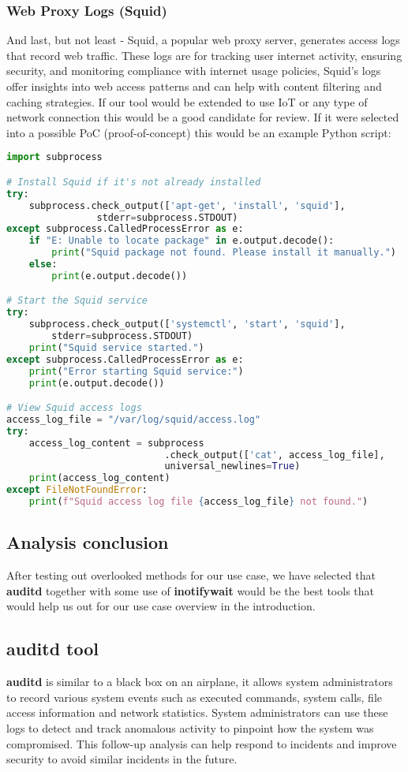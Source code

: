\documentclass{VUMIFPSmagistrinis}
\begin{document}
\subsubsection{Web Proxy Logs (Squid)}
And last, but not least - Squid, a popular web proxy server, generates access logs that record web traffic. These logs are for tracking user internet activity, ensuring security, and monitoring compliance with internet usage policies, Squid's logs offer insights into web access patterns and can help with content filtering and caching strategies. If our tool would be extended to use IoT or any type of network connection this would be a good candidate for review. If it were selected into a possible PoC (proof-of-concept) this would be an example Python script:
\begin{lstlisting}[language=Python]
import subprocess

# Install Squid if it's not already installed
try:
    subprocess.check_output(['apt-get', 'install', 'squid'], 
                stderr=subprocess.STDOUT)
except subprocess.CalledProcessError as e:
    if "E: Unable to locate package" in e.output.decode():
        print("Squid package not found. Please install it manually.")
    else:
        print(e.output.decode())

# Start the Squid service
try:
    subprocess.check_output(['systemctl', 'start', 'squid'], 
        stderr=subprocess.STDOUT)
    print("Squid service started.")
except subprocess.CalledProcessError as e:
    print("Error starting Squid service:")
    print(e.output.decode())

# View Squid access logs
access_log_file = "/var/log/squid/access.log"
try:
    access_log_content = subprocess
                            .check_output(['cat', access_log_file], 
                            universal_newlines=True)
    print(access_log_content)
except FileNotFoundError:
    print(f"Squid access log file {access_log_file} not found.")
\end{lstlisting}

\subsection{Analysis conclusion}
After testing out overlooked methods for our use case, we have selected that \textbf{auditd} together with some use of \textbf{inotifywait} would be the best tools that would help us out for our use case overview in the introduction.

\subsection{auditd tool}
\textbf{auditd} is similar to a black box on an airplane, it allows system administrators to record various system events such as executed commands, system calls, file access information and network statistics. System administrators can use these logs to detect and track anomalous activity to pinpoint how the system was compromised. This follow-up analysis can help respond to incidents and improve security to avoid similar incidents in the future.
\end{document}
